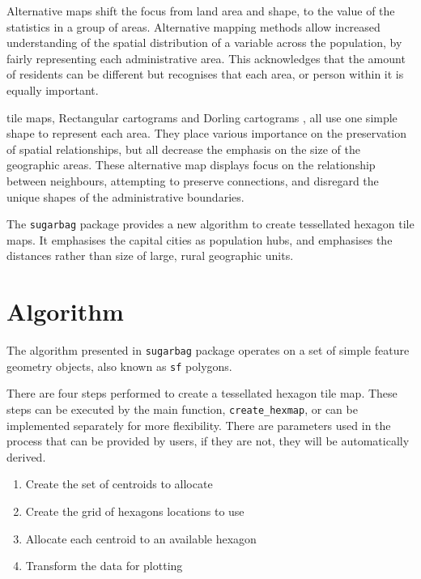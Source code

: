 \documentclass{monashthesis}
\begin{document}
Alternative maps shift the focus from land area and shape, to the value of the statistics in a group of areas.
Alternative mapping methods allow increased understanding of the spatial distribution of a variable across the population, by fairly representing each administrative area. This acknowledges that the amount of residents can be different but recognises that each area, or person within it is equally important.

tile maps, Rectangular cartograms \autocite{ORC} and Dorling cartograms \autocite{ACTUC}, all use one simple shape to represent each area. They place various importance on the preservation of spatial relationships, but all decrease the emphasis on the size of the geographic areas. These alternative map displays focus on the relationship between neighbours, attempting to preserve connections, and disregard the unique shapes of the administrative boundaries.

The \texttt{sugarbag} package provides a new algorithm to create tessellated hexagon tile maps.
It emphasises the capital cities as population hubs, and emphasises the distances rather than size of large, rural geographic units.

\hypertarget{algorithm}{%
\section{Algorithm}\label{algorithm}}

The algorithm presented in \texttt{sugarbag} package operates on a set of simple feature geometry objects, also known as \texttt{sf} \autocite{sf} polygons.

There are four steps performed to create a tessellated hexagon tile map.
These steps can be executed by the main function, \texttt{create\_hexmap}, or can be implemented separately for more flexibility. There are parameters used in the process that can be provided by users, if they are not, they will be automatically derived.

\begin{enumerate}
\def\labelenumi{\arabic{enumi}.}
\tightlist
\item
  Create the set of centroids to allocate
\item
  Create the grid of hexagons locations to use
\item
  Allocate each centroid to an available hexagon
\item
  Transform the data for plotting
\end{enumerate}
\end{document}
